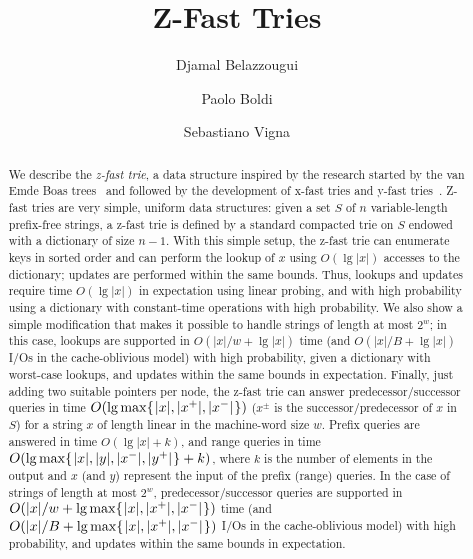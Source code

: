 \documentclass[a4paper]{article}
\title{Z-Fast Tries}
\author{Djamal Belazzougui \and Paolo Boldi\and
Sebastiano Vigna}
\date{}
\newcommand{\?}{\mskip1.5mu}
\begin{document}
\maketitle
\thispagestyle{empty}



\begin{abstract}
We describe the \emph{z-fast trie}, a
data structure inspired by the research started by the van Emde Boas
trees~\cite{EKZDIEPQ} and followed by the development of x-fast tries and y-fast tries~\cite{WilLLWRQ}. 
Z-fast tries are very
simple, uniform data structures: given a set $S$ of $n$ variable-length prefix-free strings, a z-fast trie is
defined by a standard compacted trie on $S$ endowed with a dictionary of
size $n-1$. With this simple setup, the z-fast trie can enumerate keys
in sorted order and can perform the lookup of $x$
using $O(\lg|x|)$ accesses to the dictionary; updates are performed within the
same bounds. Thus, lookups and updates require time $O(\lg|x|)$ in expectation using
linear probing, and with high probability using a dictionary
with constant-time operations with high probability. We also show a simple modification that makes it
possible to handle strings of length at most $2^w$; in this case, lookups
are supported in $O(|x|/w + \lg|x|)$ time
(and $O(|x|/B + \lg|x|)$ I/Os in the cache-oblivious
model) with high probability, given a dictionary with worst-case lookups, and updates
within the same bounds in expectation. Finally, just adding two suitable pointers
per node, the z-fast trie can answer
predecessor/successor queries in time
$O(\lg\max\{\?|x|,|x^+|,|x^-|\?\})$ ($x^\pm$ is the
successor/predecessor of $x$ in $S$) for a string $x$ of length linear in the
machine-word size $w$. Prefix queries are answered in time $O(\lg|x|+k)$, and range queries in time
$O(\lg\max\{\?|x|,|y|,|x^-|,|y^+|\?\}+k)$, where $k$ is the number of elements
in the output and  $x$ (and $y$) represent the input of the
prefix (range) queries. In the case of strings
of length at most $2^w$, predecessor/successor queries
are supported in $O(|x|/w + \lg\max\{\?|x|,|x^+|,|x^-|\?\})$ time
(and $O(|x|/B + \lg\max\{\?|x|,|x^+|,|x^-|\?\})$ I/Os in the cache-oblivious
model) with high probability, and updates within the same bounds in expectation.

\end{abstract}
\end{document}
